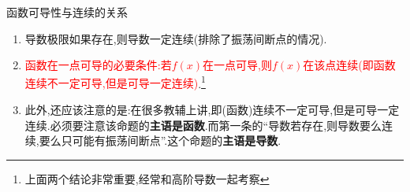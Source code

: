 \documentclass[8pt a4paper, oneside, UTF8]{ctexbook}  %
\begin{document}
\begin{sloppypar}
\begin{criterion}{函数可导性与连续的关系}{}
\begin{enumerate}
\begin{proof}[导数若存在有振荡间断点的证明:]
                      以函数$F(x)=\begin{cases}
                              x^2 \sin \dfrac{1}{x} ,x \neq 0 \\
                              0,x=0
                          \end{cases}$为例:
                      \\根据导数定义对函数在$x=0$处求导:$F'(0)=\lim_{x\to 0}\dfrac{F(x)-F(0)}{x-0}=\lim_{x\to 0}\dfrac{x^2 \sin \frac1x - 0}{x}=\lim_{x\to 0}x \sin \dfrac{1}{x}=0$因此函数$F(x)$在$x=0$处导数存在.那么对函数求导:\\
                      $F'(x)=\begin{cases}
                              2x \sin \dfrac{1}{x} -\cos \dfrac{1}{x} ,x\neq 0 \\
                              0 ,x=0
                          \end{cases}$,那么易知$\lim_{x\to 0}\left(2 x \sin \dfrac{1}{x} -\cos \dfrac{1}{x} \right)$是振荡的.虽然函数导数存在,但是这是振荡间断点.
                  \end{proof}
                  上述推论还可以用几何来解释.如果$x=0$处的导数存在,那么其函数图像在原点一定有切线.
                  \begin{figure}[H]
                      \begin{minipage}[t]{0.5\linewidth}
                          \centering
                          \texttt{[image: 3.2.3.eps]}
                          \caption{振荡间断点函数$\sin \dfrac{1}{x}$图像}
                      \end{minipage}%
                      \begin{minipage}[t]{0.5\linewidth}
                          \centering
                          \texttt{[image: 1.2.2.eps]}
                          \caption{双曲余弦函数$y=\dfrac{e^x+e^{-x}}{2}$}
                      \end{minipage}
                  \end{figure}
                  同时,导数振荡的话,则导数极限不存在,由此可以推出衍生推论:导数极限定理\ref{dsjxdl}
            \item 导数极限如果存在,则导数一定连续(排除了振荡间断点的情况).
            \item \textcolor{red}{函数在一点可导的必要条件:若$f(x)$在一点可导,则$f(x)$在该点连续(即函数连续不一定可导,但是可导一定连续)}.\footnote{上面两个结论非常重要,经常和高阶导数一起考察}
            \item 此外,还应该注意的是:在很多教辅上讲,即(函数)连续不一定可导,但是可导一定连续.必须要注意该命题的\textbf{主语是函数}.而第一条的“导数若存在,则导数要么连续,要么只可能有振荡间断点”.这个命题的\textbf{主语是导数}.

\end{enumerate}
\end{criterion}
\end{sloppypar}
\end{document}
